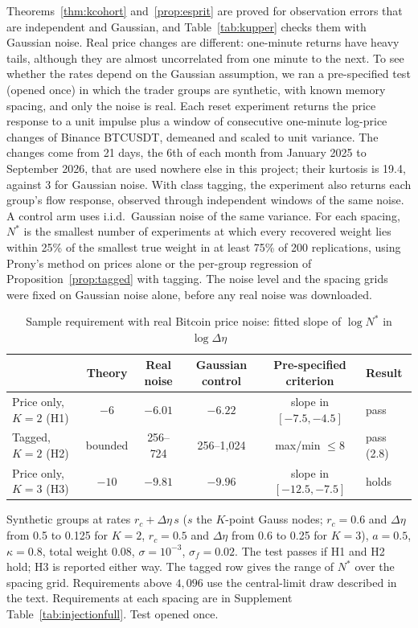 \documentclass[12pt]{article}
\theoremstyle{definition}
\theoremstyle{remark}
\begin{document}
Theorems~\ref{thm:kcohort} and~\ref{prop:esprit} are proved for observation errors that are independent and Gaussian, and Table~\ref{tab:kupper} checks them with Gaussian noise. Real price changes are different: one-minute returns have heavy tails, although they are almost uncorrelated from one minute to the next. To see whether the rates depend on the Gaussian assumption, we ran a pre-specified test (opened once) in which the trader groups are synthetic, with known memory spacing, and only the noise is real. Each reset experiment returns the price response to a unit impulse plus a window of consecutive one-minute log-price changes of Binance BTCUSDT, demeaned and scaled to unit variance. The changes come from 21 days, the 6th of each month from January 2025 to September 2026, that are used nowhere else in this project; their kurtosis is 19.4, against 3 for Gaussian noise. With class tagging, the experiment also returns each group's flow response, observed through independent windows of the same noise. A control arm uses i.i.d.\ Gaussian noise of the same variance. For each spacing, $N^*$ is the smallest number of experiments at which every recovered weight lies within 25\% of the smallest true weight in at least 75\% of 200 replications, using Prony's method on prices alone or the per-group regression of Proposition~\ref{prop:tagged} with tagging. The noise level and the spacing grids were fixed on Gaussian noise alone, before any real noise was downloaded.

\begin{table}[t]\centering\small
\begin{threeparttable}
\caption{Sample requirement with real Bitcoin price noise: fitted slope of $\log N^*$ in $\log\Delta\eta$}\label{tab:injection}
\begin{tabular}{lccccl}
\toprule
 & Theory & Real noise & Gaussian control & Pre-specified criterion & Result\\
\midrule
Price only, $K=2$ (H1) & $-6$ & $-6.01$ & $-6.22$ & slope in $[-7.5,-4.5]$ & pass\\
Tagged, $K=2$ (H2) & bounded & 256--724 & 256--1{,}024 & max/min $\le8$ & pass (2.8)\\
Price only, $K=3$ (H3) & $-10$ & $-9.81$ & $-9.96$ & slope in $[-12.5,-7.5]$ & holds\\
\bottomrule
\end{tabular}
\begin{tablenotes}\footnotesize\item Synthetic groups at rates $r_c+\Delta\eta\,s$ ($s$ the $K$-point Gauss nodes; $r_c=0.6$ and $\Delta\eta$ from 0.5 to 0.125 for $K=2$, $r_c=0.5$ and $\Delta\eta$ from 0.6 to 0.25 for $K=3$), $a=0.5$, $\kappa=0.8$, total weight 0.08, $\sigma=10^{-3}$, $\sigma_f=0.02$. The test passes if H1 and H2 hold; H3 is reported either way. The tagged row gives the range of $N^*$ over the spacing grid. Requirements above $4{,}096$ use the central-limit draw described in the text. Requirements at each spacing are in Supplement Table~\ref{tab:injectionfull}. Test opened once.\end{tablenotes}
\end{threeparttable}
\end{table}
\end{document}
